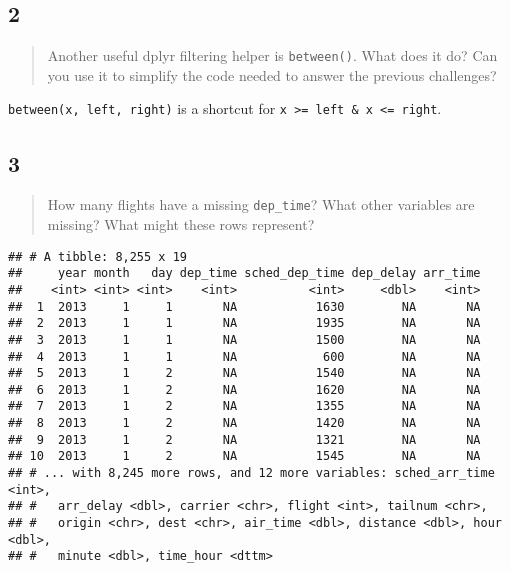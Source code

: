 \documentclass[]{article}
\newenvironment{Shaded}{\begin{snugshade}}{\end{snugshade}}
\newcommand{\KeywordTok}[1]{\textcolor[rgb]{0.13,0.29,0.53}{\textbf{#1}}}
\newcommand{\NormalTok}[1]{#1}
\newcommand{\OperatorTok}[1]{\textcolor[rgb]{0.81,0.36,0.00}{\textbf{#1}}}
\newcommand{\StringTok}[1]{\textcolor[rgb]{0.31,0.60,0.02}{#1}}
\begin{document}
\hypertarget{section-9}{%
\subsection{2}\label{section-9}}

\begin{quote}
Another useful dplyr filtering helper is \texttt{between()}. What does
it do? Can you use it to simplify the code needed to answer the previous
challenges?
\end{quote}

\texttt{between(x,\ left,\ right)} is a shortcut for
\texttt{x\ \textgreater{}=\ left\ \&\ x\ \textless{}=\ right}.

\hypertarget{section-10}{%
\subsection{3}\label{section-10}}

\begin{quote}
How many flights have a missing \texttt{dep\_time}? What other variables
are missing? What might these rows represent?
\end{quote}

\begin{Shaded}
\end{Shaded}

\begin{verbatim}
## # A tibble: 8,255 x 19
##     year month   day dep_time sched_dep_time dep_delay arr_time
##    <int> <int> <int>    <int>          <int>     <dbl>    <int>
##  1  2013     1     1       NA           1630        NA       NA
##  2  2013     1     1       NA           1935        NA       NA
##  3  2013     1     1       NA           1500        NA       NA
##  4  2013     1     1       NA            600        NA       NA
##  5  2013     1     2       NA           1540        NA       NA
##  6  2013     1     2       NA           1620        NA       NA
##  7  2013     1     2       NA           1355        NA       NA
##  8  2013     1     2       NA           1420        NA       NA
##  9  2013     1     2       NA           1321        NA       NA
## 10  2013     1     2       NA           1545        NA       NA
## # ... with 8,245 more rows, and 12 more variables: sched_arr_time <int>,
## #   arr_delay <dbl>, carrier <chr>, flight <int>, tailnum <chr>,
## #   origin <chr>, dest <chr>, air_time <dbl>, distance <dbl>, hour <dbl>,
## #   minute <dbl>, time_hour <dttm>
\end{verbatim}
\end{document}
